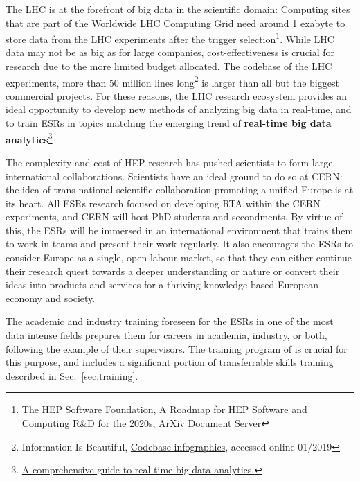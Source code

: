 \noindent\color{blue}{Big data}\color{black}
The LHC is at the forefront of big data in the scientific domain: Computing sites that are part of the Worldwide LHC Computing Grid need around 1 exabyte to store data from the LHC experiments after the trigger selection\footnote{The HEP Software Foundation, \href{https://arxiv.org/pdf/1712.06982.pdf}{A Roadmap for HEP Software and Computing R\&D for the 2020s}, ArXiv Document Server}. While LHC data may not be as big as for large companies, cost-effectiveness is crucial for research due to the more limited budget allocated. 
The codebase of the LHC experiments, more than 50 million lines long\footnote{Information Is Beautiful, \href{http://www.informationisbeautiful.net/visualizations/million-lines-of-code/}{Codebase infographics}, accessed online 01/2019} is larger than all but the biggest commercial projects.  
For these reasons, the LHC research ecosystem provides an ideal opportunity to develop new methods of analyzing big data in real-time, and to train ESRs in topics matching the emerging trend of \textbf{real-time big data analytics}\footnote{\href{https://www.scnsoft.com/blog/real-time-big-data-analytics-comprehensive-guide}{A comprehensive guide to real-time big data analytics.}} 


\noindent\color{blue}{International networking. }\color{black}
The complexity and cost of HEP research has pushed scientists to form large, 
international collaborations. Scientists have an ideal ground to do so at CERN: 
the idea of trans-national scientific collaboration promoting a unified Europe
is at its heart.
All \acronym ESRs research focused on developing RTA within the 
CERN experiments, and CERN will host PhD students and secondments. 
By virtue of this, the ESRs will be immersed in an
international environment that trains them to work in teams and present their work regularly.
It also encourages the ESRs to consider Europe as a single, open labour market,
so that they can either continue their research quest towards a deeper understanding or nature
or convert their ideas into products and services for a thriving knowledge-based European
economy and society. 

\noindent\color{blue}{Transferable skills training. }\color{black}
The academic and industry training foreseen for the 
ESRs in one of the most data intense fields
prepares them for careers in academia, industry, or both, 
following the example of their supervisors. The training program of \acronym
is crucial for this purpose, and includes a significant portion of transferrable skills training
described in Sec.~\ref{sec:training}.

